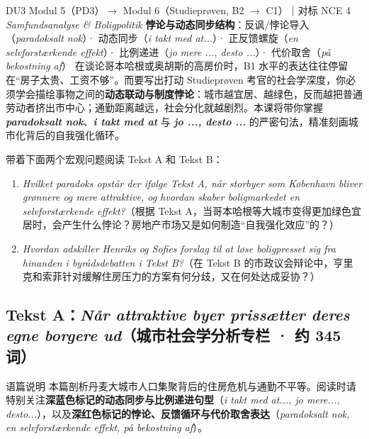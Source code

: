 {DU3 Modul 5（PD3）$\rightarrow$ Modul 6（Studieprøven, B2 $\rightarrow$ C1）｜对标 NCE 4 \textit{Samfundsanalyse \& Boligpolitik}}
{\textbf{悖论与动态同步结构}：反讽/悖论导入（\textit{paradoksalt nok}）· 动态同步（\textit{i takt med at...}）· 正反馈螺旋（\textit{en selvforstærkende effekt}）· 比例递进（\textit{jo mere ..., desto ...}）· 代价取舍（\textit{på bekostning af}）}
{在谈论哥本哈根或奥胡斯的高房价时，B1 水平的表达往往停留在“房子太贵、工资不够”。而要写出打动 Studieprøven 考官的社会学深度，你必须学会描绘事物之间的\textbf{动态联动与制度悖论}：城市越宜居、越绿色，反而越把普通劳动者挤出市中心；通勤距离越远，社会分化就越剧烈。本课将带你掌握 \textbf{\textit{paradoksalt nok}}、\textbf{\textit{i takt med at}} 与 \textbf{\textit{jo ..., desto ...}} 的严密句法，精准刻画城市化背后的自我强化循环。}

\begin{foerduleaeser}
带着下面两个宏观问题阅读 Tekst A 和 Tekst B：
\begin{enumerate}
  \item \textit{Hvilket paradoks opstår der ifølge Tekst A, når storbyer som København bliver grønnere og mere attraktive, og hvordan skaber boligmarkedet en selvforstærkende effekt?}（根据 Tekst A，当哥本哈根等大城市变得更加绿色宜居时，会产生什么悖论？房地产市场又是如何制造“自我强化效应”的？）
  \item \textit{Hvordan adskiller Henriks og Sofies forslag til at løse boligpresset sig fra hinanden i byrådsdebatten i Tekst B?}（在 Tekst B 的市政议会辩论中，亨里克和索菲针对缓解住房压力的方案有何分歧，又在何处达成妥协？）
\end{enumerate}
\end{foerduleaeser}


\subsection*{Tekst A：\textit{Når attraktive byer prissætter deres egne borgere ud}（城市社会学分析专栏 · 约 345 词）}

\begin{tipbox}{语篇说明}
本篇剖析丹麦大城市人口集聚背后的住房危机与通勤不平等。阅读时请特别关注\textbf{\color{NCDNavy}深蓝色标记的动态同步与比例递进句型}（\textit{i takt med at..., jo mere..., desto...}），以及\textbf{\color{NCDRed}深红色标记的悖论、反馈循环与代价取舍表达}（\textit{paradoksalt nok, en selvforstærkende effekt, på bekostning af}）。
\end{tipbox}

